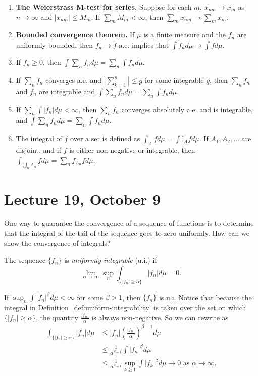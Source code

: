\documentclass[11pt,fleqn]{book} %
\begin{document}
\begin{enumerate}[label=\arabic*.]
	\item \textbf{The Weierstrass M-test for series.} Suppose for each $m$, $x_{nm} \to x_m$ as $n \to \infty$ and $|x_{nm}| \leq M_m$. If $\sum_m M_m < \infty$, then $\sum_m x_{nm} \to \sum_m x_m$.
	\item \textbf{Bounded convergence theorem.} If $\mu$ is a finite measure and the $f_n$ are uniformly bounded, then $f_n \to f$ a.e. implies that $\int f_n d\mu \to \int f d\mu$.
	\item If $f_n \geq 0$, then $\int \sum_n f_n d\mu = \sum_n \int f_n d\mu$.
	\item If $\sum_n f_n$ converges a.e. and $|\sum_{k=1}^n| \leq g$ for some integrable $g$, then $\sum_n f_n$ and $f_n$ are integrable and $\int \sum_n f_n d\mu = \sum_n \int f_n d\mu$.
	\item If $\sum_n \int |f_n| d\mu < \infty$, then $\sum_n f_n$ converges absolutely a.e. and is integrable, and $\int \sum_n f_n d\mu = \sum_n \int f_n d\mu$.
	\item The integral of $f$ over a set is defined as $\int_A f d\mu = \int \mathbb{I}_A f d\mu$. If $A_1,A_2,\dots$ are disjoint, and if $f$ is either non-negative or integrable, then $\int_{\bigcup_n A_n} f d\mu = \sum_n f_{A_n} f d\mu$.
\end{enumerate}

\section{Lecture 19, October 9}

One way to guarantee the convergence of a sequence of functions is to determine that the integral of the tail of the sequence goes to zero uniformly. How can we show the convergence of integrals?

\begin{definition} \label{def:uniform-integrability}
	The sequence $\{f_n\}$ is \emph{uniformly integrable} (u.i.) if
	\[
		\lim_{\alpha \to \infty} \sup_n \int_{\{|f_n| \geq \alpha\}} |f_n| d\mu = 0.
	\]
\end{definition}

If $\sup_n \int |f_n|^{\beta} d\mu < \infty$ for some $\beta > 1$, then $\{f_n\}$ is u.i. Notice that because the integral in Definition~\ref{def:uniform-integrability} is taken over the set on which $\{|f_n| \geq \alpha\}$, the quantity $\frac{|f_n|}{\alpha}$ is always non-negative. So we can rewrite as
\begin{align*}
	\int_{\{|f_n| \geq \alpha\}} |f_n| d\mu &\leq |f_n| \left( \frac{|f_n|}{\alpha} \right)^{\beta-1} d\mu \\
	&\leq \frac{1}{\alpha^{\beta-1}} \int |f_n|^\beta d\mu \\
	&\leq \frac{1}{\alpha^{\beta-1}} \sup_{k \geq 1} \int |f_k|^\beta d\mu \to 0 \textrm{ as } \alpha \to \infty.
\end{align*}
\end{document}
